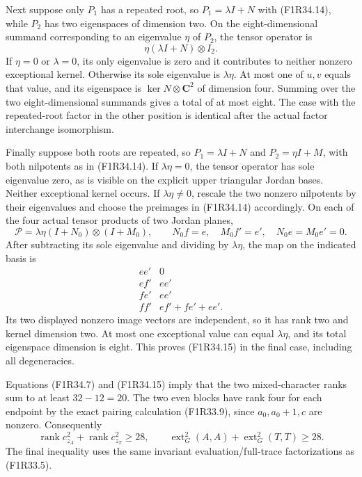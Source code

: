 Next suppose only $P_1$ has a
repeated root, so $P_1=\lambda I+N$
with (F1R34.14), while $P_2$ has
two eigenspaces of dimension two.
On the eight-dimensional summand
corresponding to an eigenvalue
$\eta$ of $P_2$, the tensor operator
is
\[
                  \eta(\lambda I+N)\otimes I_2.
 \tag{F1R34.17}
\]
If $\eta=0$ or $\lambda=0$, its
only eigenvalue is zero and it
contributes to neither nonzero
exceptional kernel. Otherwise its
sole eigenvalue is $\lambda\eta$.
At most one of $u,v$ equals that
value, and its eigenspace is
$\ker N\otimes\mathbf C^2$ of
dimension four. Summing over the
two eight-dimensional summands
gives a total of at most eight.
The case with the repeated-root
factor in the other position is
identical after the actual factor
interchange isomorphism.

Finally suppose both roots are
repeated, so $P_1=\lambda I+N$
and $P_2=\eta I+M$, with both
nilpotents as in (F1R34.14).
If $\lambda\eta=0$, the tensor
operator has sole eigenvalue zero,
as is visible on the explicit
upper triangular Jordan bases.
Neither exceptional kernel occurs.
If $\lambda\eta\ne0$, rescale the
two nonzero nilpotents by their
eigenvalues and choose the
preimages in (F1R34.14) accordingly.
On each of the four actual tensor
products of two Jordan planes,
\[
 \mathcal P=\lambda\eta(I+N_0)\otimes(I+M_0),
 \qquad N_0 f=e,\quad M_0 f'=e',\quad
                N_0e=M_0e'=0.
 \tag{F1R34.18}
\]
After subtracting its sole eigenvalue
and dividing by $\lambda\eta$,
the map on the indicated basis is
\[
 \begin{array}{c|c}
 ee'&0\\
 ef'&ee'\\
 fe'&ee'\\
 ff'&ef'+fe'+ee'.
 \end{array}
 \tag{F1R34.19}
\]
Its two displayed nonzero image
vectors are independent, so it
has rank two and kernel dimension
two. At most one exceptional value
can equal $\lambda\eta$, and its
total eigenspace dimension is eight.
This proves (F1R34.15) in the final
case, including all degeneracies.

Equations (F1R34.7) and
(F1R34.15) imply that the two
mixed-character ranks sum to at
least $32-12=20$. The two even
blocks have rank four for each
endpoint by the exact pairing
calculation (F1R33.9), since
$a_0,a_0+1,c$ are nonzero.
Consequently
\[
          \operatorname{rank}c^2_{z_A}
             +\operatorname{rank}c^2_{z_T}\ge28,
 \qquad
          \operatorname{ext}^2_G(A,A)
             +\operatorname{ext}^2_G(T,T)\ge28.
 \tag{F1R34.20}
\]
The final inequality uses the same
invariant evaluation/full-trace
factorizations as (F1R33.5).

